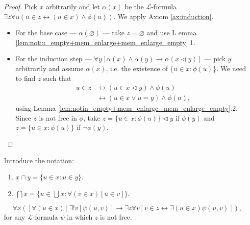 \begin{proof}
    \leanok
    Pick $x$ arbitrarily and let $\alpha (x)$ be the $\mathcal{L}$-formula 
    $\exists z \forall u (u\in z \leftrightarrow (u \in x) \land \phi (u))$.
    We apply Axiom \ref{ax:induction}.
    \begin{itemize}
        \item For the base case — $\alpha (\varnothing)$ — take $z=\varnothing$ and use L
        emma \ref{lem:notin_empty+mem_enlarge+mem_enlarge_empty}.1.
        \item For the induction step 
        — $\forall y[\alpha(x) \land \alpha(y) \rightarrow \alpha(x \lhd y)]$ — 
        pick $y$ arbitrarily and assume $\alpha(x)$, i.e. 
        the existence of $ \{u \in x : \phi (u)\}$. We need to find $z$ such that
    \begin{equation*}
    \begin{split}
        u \in z & \leftrightarrow (u \in x \lhd y) \land \phi (u)\\
        & \leftrightarrow (u \in x \lor u = y) \land \phi (u),
    \end{split}
    \end{equation*}
    using Lemma \ref{lem:notin_empty+mem_enlarge+mem_enlarge_empty}.2.
    Since $z$ is not free in $\phi$, take $z = \{u \in x : \phi (u)\} \lhd y$ if $\phi(y)$ 
    and $z=\{u \in x : \phi (u)\}$ if $\neg \phi(y)$.
    \end{itemize}
\end{proof}

\begin{definition}[Intersection]
    \label{def:inter+sInter}
    \leanok
    Introduce the notation:
    \begin{enumerate}
        \item $x \cap y = \{u \in x : u \in y\}$.
        \item $\bigcap x = \{u \in \bigcup x : \forall (v \in x)[u \in v] \}$.
    \end{enumerate}  
\end{definition}

\begin{theorem}
    \label{thm:repl_scheme}
    $$\forall x ([\forall (u \in x) [\exists! v] \psi (u,v)]\rightarrow 
    \exists z \forall v [v\in z \leftrightarrow \exists(u \in x) \psi (u,v)]),$$ 
    for any $\mathcal{L}$-formula $\psi$ in which $z$ is not free.
\end{theorem}

